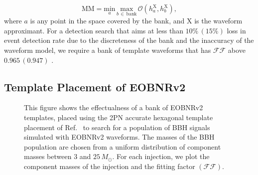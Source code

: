 \documentclass[aps,
prd,
amsmath,
amssymb,
twocolumn,
floatfix,
groupedaddress]{revtex4-1}
\newcommand{\Olap}{\mathcal{O}}
\newcommand{\FF}{\mathcal{FF}}
\newcommand{\MM}{\mathrm{MM}}
\newcommand{\X}{\mathrm{X}}
\def\l({\left(}
\def\r){\right)}
\begin{document}
\begin{equation}
\MM = \underset{a}{\textrm{min}}\,\underset{b\, \in\, \mathrm{bank}}{\textrm{max}}\,\Olap(h^{\X}_a,h^{\X}_b),
\end{equation}
where $a$ is any point in the space covered by the bank, and $\X$ is the waveform approximant. For a detection search that aims at less than $10\%\, (15\%)$ loss in event detection rate due to the discreteness of the bank and the inaccuracy of the waveform model, we require a bank of template waveforms that has $\mathcal{FF}$ above $0.965\, (0.947)$ \citep{WaveformAccuracy2008,WaveformAccuracy2010,CompTemplates2009}.

\subsection{Template Placement of EOBNRv2}\label{sec:level2:EOBNRv2templateplacement}
\begin{figure}
	\begin{center}
	\end{center}
\caption{This figure shows the effectualness of a bank of EOBNRv2 templates, placed using the 2PN accurate hexagonal template placement of Ref.~\citep{BabaketalBankPlacement} to search for a population of BBH signals simulated with EOBNRv2 waveforms. The masses of the BBH population are chosen from a uniform distribution of component masses between $3$ and $25\, M_{\odot}$. For each injection, we plot the component masses of the injection and the fitting factor $\l(\FF\r)$.}
\label{fig:match_eobeob_all}
\end{figure}
\end{document}
